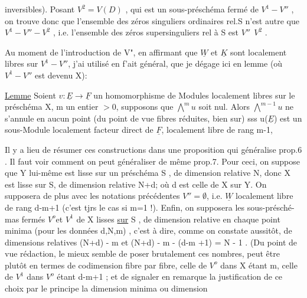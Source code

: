
inversibles). Posant $V^2 = V(D)$ , qui est un sous-préschéma fermé de
$V^1-V''$ , on trouve donc que l'ensemble des  zéros singuliers
ordinaires rel.S n'est autre que $V^1 - V'' - V^2$ , i.e. l'ensemble des
zéros supersinguliers  rel à S est $V''\ \ V^2$ .

\placedmargin{$\|$} Au moment de l'introduction de V", en affirmant que $\underline{W}$ et $\underline{K}$ sont
localement libres sur $V^1-V''$, j'ai utilisé en f'ait général, que je dégage
ici en lemme (où $V^1-V''$ est devenu X):

\uline{Lemme} Soient $v\colon \underline{E} \to \underline{F}$ un homomorphisme de Modules localement libres
sur le préschéma X,  m un entier $>0$, supposons que $\bigwedge^{m} u$ soit
nul.  Alors
$\bigwedge^{m-1} u$ ne s'annule en aucun point (du point de vue fibres réduites, bien
sur)  sss u($\underline{E}$) est un sous-Module localement facteur direct de $\underline{F}$,
localement libre de rang m-1, 

Il y a lieu de résumer ces constructions dans une proposition
qui généralise prop.6 . Il faut voir comment on peut généraliser de même
prop.7. Pour ceci, on suppose que Y lui-même est lisse sur un préschéma
S , de dimension relative N, donc X est lisse sur S, de dimension relative N+d\unsure{\hand{$^*$}}; où d est celle de X
sur Y. On supposera de plus avec les notations précédentes $V''=\emptyset$, i.e.
$\underline{W}$ localement libre de rang d-m+1 (c'est tjrs le cas si m=1 !). Enfin, on supposera les sous-présché-%
mas fermés  $V^o$et $V^1$ de X lisses \uline{sur} S , de dimension relative  en chaque
point minima (pour les données d,N,m) ,  c'est à dire, comme
on constate aussitôt, de dimensions relatives (N+d) - m et
(N+d) - m - (d-m +1) = N - 1 . (Du point de vue rédaction, le mieux
semble de poser brutalement ces nombres, peut être plutôt en termes
de codimension fibre par fibre, celle de $V^o$ dans X étant m, celle de
$V^1$ dans $V^o$ étant d-m+1 ; et de signaler en remarque la justification
de ce choix par le principe  la dimension minima ou dimension 

